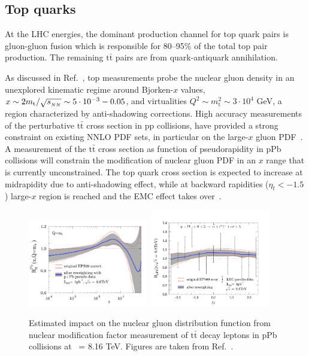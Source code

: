 \subsection{Top quarks}

At the LHC energies, the dominant production channel for top quark pairs is 
gluon-gluon fusion which is responsible for 80--95\% of the total top pair production. 
The remaining $\mathrm{t}\bar{\mathrm{t}}$ pairs are from quark-antiquark annihilation. 

As discussed in Ref.~\cite{d'Enterria:2015jna}, top measurements probe the 
nuclear gluon density in an unexplored kinematic regime around Bjorken-$x$ 
values, $x \sim 2m_{\mathrm{t}}/\sqrt{s_{_{NN}}} \sim 5 \cdot 10^{-3}-0.05$, 
and virtualities $Q^{2} \sim m_{\mathrm{t}}^{2} \sim 3 \cdot 10^{4}$ GeV, 
a region characterized by anti-shadowing corrections. High accuracy measurements 
of the perturbative $\mathrm{t}\bar{\mathrm{t}}$ cross section in pp collisions, 
have provided a strong constraint on existing NNLO PDF sets, in particular on 
the large-$x$ gluon PDF~\cite{Czakon:2013tha}. A measurement of the 
$\mathrm{t}\bar{\mathrm{t}}$ cross section as function of pseudorapidity 
in pPb collisions will constrain the modification of nuclear gluon PDF in 
an $x$ range that is currently unconstrained. The top quark cross section 
is expected to increase at midrapidity due to anti-shadowing effect,
while at backward rapidities ($\eta_{t}<-1.5$) large-$x$ region is reached 
and the EMC effect takes over~\cite{d'Enterria:2015jna}.

\begin{figure}[h!]
\begin{center}
  \includegraphics[width= 0.47\textwidth]{figures/top/gluons2.png}
  \includegraphics[width= 0.47\textwidth]{figures/top/data2.png}
  \caption{Estimated impact on the nuclear gluon distribution function
   from nuclear modification factor measurement of $\mathrm{t}\bar{\mathrm{t}}$ 
   decay leptons in pPb collisions at \rootsNN\ = 8.16 TeV.
  Figures are taken from Ref.~\cite{d'Enterria:2015jna}.
  }
\label{fig:ttnPDF}
\end{center}
\end{figure}

